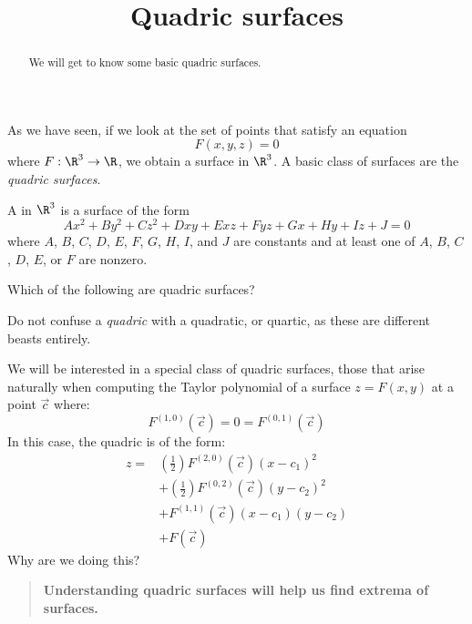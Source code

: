 \documentclass{ximera}
\title[Dig-In:]{Quadric surfaces}
\begin{document}
\begin{abstract}
  We will get to know some basic quadric surfaces.
\end{abstract}
\maketitle

As we have seen, if we look at the set of points that satisfy an
equation
\[
F(x,y,z)=0
\]
where $F:\R^3\to\R$, we obtain a surface in $\R^3$. A basic class of
surfaces are the \textit{quadric surfaces}.

\begin{definition}
A  in $\R^3$ is a surface of the form
\[
Ax^2 + By^2 + Cz^2 + Dxy + Exz+ Fyz + Gx + Hy + I z + J = 0
\]
where $A$, $B$, $C$, $D$, $E$, $F$, $G$, $H$, $I$, and $J$ are
constants and at least one of $A$, $B$, $C$, $D$, $E$, or $F$ are
nonzero.
\end{definition}

\begin{question}
  Which of the following are quadric surfaces?
  \begin{selectAll}
  \end{selectAll}
\end{question}

\begin{warning}
  Do not confuse a \textit{quadric} with a quadratic, or quartic, as
  these are different beasts entirely.
\end{warning}

We will be interested in a special class of quadric surfaces, those
that arise naturally when computing the Taylor polynomial of a surface
$z=F(x,y)$ at a point $\vec{c}$ where:
\[
F^{(1,0)}(\vec{c}) = 0 = F^{(0,1)}(\vec{c})
\]
In this case, the quadric is of the form:
\begin{align*}
  z = &\left(\frac{1}{2}\right)F^{(2,0)}(\vec{c})(x-c_1)^2 \\
  &+ \left(\frac{1}{2}\right)F^{(0,2)}(\vec{c})(y-c_2)^2 \\
  &+ F^{(1,1)}(\vec{c}) (x-c_1)(y-c_2)\\
  &+ F(\vec{c})
\end{align*}
Why are we doing this?
\begin{quote}
  \textbf{Understanding quadric surfaces will help us find extrema of
    surfaces.}
\end{quote}
\end{document}
